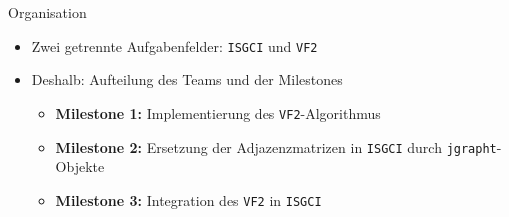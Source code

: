 \begin{frame}{Organisation}{}
	\begin{itemize}
	  \large
	  \setlength\itemsep{1em}
	  \item Zwei getrennte Aufgabenfelder: \texttt{ISGCI} und \texttt{VF2} \\
	  \item Deshalb: Aufteilung des Teams und der Milestones
	  \begin{itemize}[]
	    \setlength\itemsep{1em}
	    \large
	    \item {\bf \beamerblue Milestone 1:} Implementierung des \texttt{VF2}-Algorithmus
	    \item {\bf \beamerblue Milestone 2:} Ersetzung der Adjazenzmatrizen in \texttt{ISGCI} durch
	      \texttt{jgrapht}-Objekte
	    \item {\bf \beamerblue Milestone 3:} Integration des \texttt{VF2} in \texttt{ISGCI}
	  \end{itemize}
	\end{itemize}
\end{frame}
